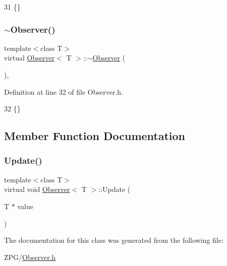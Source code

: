 \begin{DoxyCode}
31 \{\}
\end{DoxyCode}
\mbox{\label{classObserver_a28d160e9d15f30ff1eb6dc856db01e1a}} 
\subsubsection{\texorpdfstring{$\sim$\+Observer()}{~Observer()}}
{\footnotesize\ttfamily template$<$class T$>$ \\
virtual \mbox{\hyperlink{classObserver}{Observer}}$<$ T $>$\+::$\sim$\mbox{\hyperlink{classObserver}{Observer}} (\begin{DoxyParamCaption}{ }\end{DoxyParamCaption})\hspace{0.3cm}{\ttfamily [inline]}, {\ttfamily [virtual]}}



Definition at line 32 of file Observer.\+h.


\begin{DoxyCode}
32 \{\}
\end{DoxyCode}


\subsection{Member Function Documentation}
\mbox{\label{classObserver_a3440221897a56f77975c504b0797c0d5}} 
\subsubsection{\texorpdfstring{Update()}{Update()}}
{\footnotesize\ttfamily template$<$class T$>$ \\
virtual void \mbox{\hyperlink{classObserver}{Observer}}$<$ T $>$\+::Update (\begin{DoxyParamCaption}\item[{T $\ast$}]{value }\end{DoxyParamCaption})\hspace{0.3cm}{\ttfamily [pure virtual]}}



The documentation for this class was generated from the following file\+:\begin{DoxyCompactItemize}
\item 
Z\+P\+G/\mbox{\hyperlink{Observer_8h}{Observer.\+h}}\end{DoxyCompactItemize}
